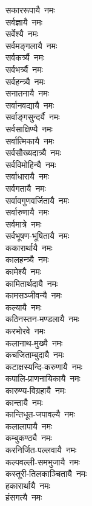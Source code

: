 \begin{multicols}{2}
\begin{flushleft}
सकाररूपायै~नमः\\
सर्वज्ञायै~नमः\\
सर्वेश्यै~नमः\\
सर्वमङ्गलायै~नमः\\
सर्वकर्त्र्यै~नमः\\
सर्वभर्त्र्यै~नमः\\
सर्वहन्त्र्यै~नमः\\
सनातनायै~नमः\\
सर्वानवद्यायै~नमः\\
सर्वाङ्गसुन्दर्यै~नमः\hfill {}\\
सर्वसाक्षिण्यै~नमः\\
सर्वात्मिकायै~नमः\\
सर्वसौख्यदात्र्यै~नमः\\
सर्वविमोहिन्यै~नमः\\
सर्वाधारायै~नमः\\
सर्वगतायै~नमः\\
सर्वावगुणवर्जितायै~नमः\\
सर्वारुणायै~नमः\\
सर्वमात्रे~नमः\\
सर्वभूषण-भूषितायै~नमः\hfill {}\\
ककारार्थायै~नमः\\
कालहन्त्र्यै~नमः\\
कामेश्यै~नमः\\
कामितार्थदायै~नमः\\
कामसञ्जीवन्यै~नमः\\
कल्यायै~नमः\\
कठिनस्तन-मण्डलायै~नमः\\
करभोरवे~नमः\\
कलानाथ-मुख्यै~नमः\\
कचजिताम्बुदायै~नमः\hfill {}\\
कटाक्षस्यन्दि-करुणायै~नमः\\
कपालि-प्राणनायिकायै~नमः\\
कारुण्य-विग्रहायै~नमः\\
कान्तायै~नमः\\
कान्तिधूत-जपावल्यै~नमः\\
कलालापायै~नमः\\
कम्बुकण्ठ्यै~नमः\\
करनिर्जित-पल्लवायै~नमः\\
कल्पवल्ली-समभुजायै~नमः\\
कस्तूरी-तिलकाञ्चितायै~नमः\hfill {}\\
हकारार्थायै~नमः\\
हंसगत्यै~नमः\\

\end{flushleft}
\end{multicols}
